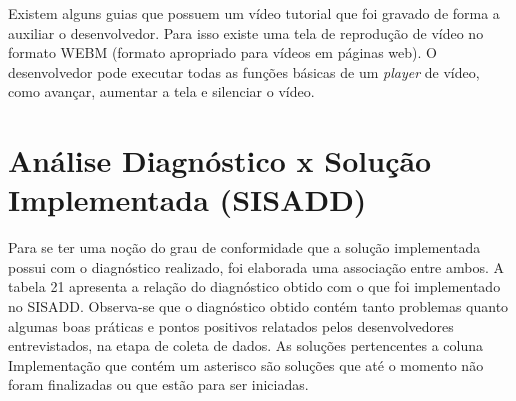 Existem alguns guias que possuem um vídeo tutorial que foi gravado de forma a auxiliar o desenvolvedor. Para isso existe uma tela de reprodução de vídeo no formato WEBM (formato apropriado para vídeos em páginas web). O desenvolvedor pode executar todas as funções básicas de um \textit{player} de vídeo, como avançar, aumentar a tela e silenciar o vídeo.

\section{Análise Diagnóstico x Solução Implementada (SISADD)}

Para se ter uma noção do grau de conformidade que a solução implementada possui com o diagnóstico realizado, foi elaborada uma associação entre ambos. A tabela 21 apresenta a relação do diagnóstico obtido com o que foi implementado no SISADD. Observa-se que o diagnóstico obtido contém tanto problemas quanto algumas boas práticas e pontos positivos relatados pelos desenvolvedores entrevistados, na etapa de coleta de dados. As soluções pertencentes a coluna Implementação que contém um asterisco são soluções que até o momento não foram finalizadas ou que estão para ser iniciadas.


